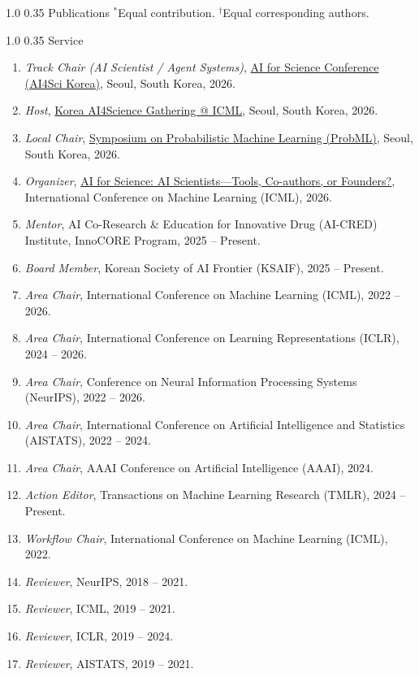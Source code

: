 \documentclass[11pt]{article}
\makeatletter
\newcommand{\cventry}[3]{%
  \item \textit{#1}, #2, #3.%
}
\renewcommand{\section}{\@startsection{section}{1}{0pt}%
  {1.0\baselineskip}%
  {0.35\baselineskip}%
  {\Large\bfseries}}
\makeatother
\begin{document}
\section{Publications}
{\small $^*$Equal contribution. $^\dagger$Equal corresponding authors.}\par
\begingroup
\setlength{\emergencystretch}{2em}

\endgroup

\section{Service}
\begin{enumerate}
\cventry{Track Chair (AI Scientist / Agent Systems)}{\href{https://ai4scikorea.org/}{AI for Science Conference (AI4Sci Korea)}, Seoul, South Korea}{2026}
\cventry{Host}{\href{https://holymollyhao.github.io/ai4science-korea/}{Korea AI4Science Gathering @ ICML}, Seoul, South Korea}{2026}
\cventry{Local Chair}{\href{https://probml.cc/}{Symposium on Probabilistic Machine Learning (ProbML)}, Seoul, South Korea}{2026}
\cventry{Organizer}{\href{https://ai4sciencecommunity.github.io/icml26}{AI for Science: AI Scientists---Tools, Co-authors, or Founders?}, International Conference on Machine Learning (ICML)}{2026}
\cventry{Mentor}{AI Co-Research \& Education for Innovative Drug (AI-CRED) Institute, InnoCORE Program}{2025 -- Present}
\cventry{Board Member}{Korean Society of AI Frontier (KSAIF)}{2025 -- Present}
\cventry{Area Chair}{International Conference on Machine Learning (ICML)}{2022 -- 2026}
\cventry{Area Chair}{International Conference on Learning Representations (ICLR)}{2024 -- 2026}
\cventry{Area Chair}{Conference on Neural Information Processing Systems (NeurIPS)}{2022 -- 2026}
\cventry{Area Chair}{International Conference on Artificial Intelligence and Statistics (AISTATS)}{2022 -- 2024}
\cventry{Area Chair}{AAAI Conference on Artificial Intelligence (AAAI)}{2024}
\cventry{Action Editor}{Transactions on Machine Learning Research (TMLR)}{2024 -- Present}
\cventry{Workflow Chair}{International Conference on Machine Learning (ICML)}{2022}
\cventry{Reviewer}{NeurIPS}{2018 -- 2021}
\cventry{Reviewer}{ICML}{2019 -- 2021}
\cventry{Reviewer}{ICLR}{2019 -- 2024}
\cventry{Reviewer}{AISTATS}{2019 -- 2021}
\end{enumerate}
\end{document}
